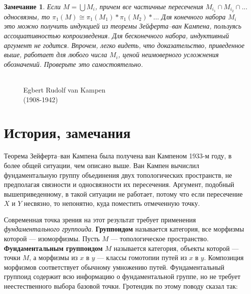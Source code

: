 \documentclass[12pt]{book}
\theoremstyle{upshape}
\newtheorem{zadacha}{Задача}[chapter]
\theoremstyle{generic}
\newtheorem{remark}[teorema]{Замечание}
\def\замечание{\begin{remark}}
\def\еза{\end{remark}}
\theoremstyle{upshapenonumber}
\newcommand{\следствие}{%
     \refstepcounter{teorema}
     {\noindent\bf Следствие \thechapter.\arabic{teorema}:\ }}
\newcommand{\пример}{%
     \refstepcounter{teorema}
     {\noindent\bf Пример \thechapter.\arabic{teorema}:\ }}
\newcommand{\лемма}{%
     \refstepcounter{teorema}
     {\noindent\bf Лемма \thechapter.\arabic{teorema}:\ }}
\newcommand{\теорема}{%
     \refstepcounter{teorema}
     {\noindent\bf Теорема \thechapter.\arabic{teorema}:\ }}
\newcommand{\утверждение}{%
     \refstepcounter{teorema}
     {\noindent\bf Утверждение \thechapter.\arabic{teorema}:\ }}
\def\хфилл{\hfill}
\def\бф{\bf}
\def\ем{\em}
\def\задача{\begin{zadacha}}
\def\ез{\end{zadacha}}
\def\еу{\end{ukazanie}}
\def\ео{\end{opredelenie}}
\def\енум{\begin{enumerate}}
\def\ее{\end{enumerate}}
\begin{document}
\замечание
Если $M= \bigcup M_i$, причем все частичные
пересечения $M_{i_1}\cap M_{i_2} \cap ...$
односвязны, то 
$\pi_1(M) \cong \pi_1(M_1) * \pi_1(M_2) *...$
Для конечного набора $M_i$ это можно получить
индукцией из теоремы Зейферта--ван Кампена,
пользуясь ассоциативностью копроизведения.
Для бесконечного набора, индуктивный аргумент не
годится. Впрочем, легко видеть, что доказательство,
приведенное выше, работает для любого числа
$M_i$, ценой неимоверного усложнения обозначений.
Проверьте это самостоятельно.
\еза



\begin{figure}[ht]
\begin{center}
\\
{ Egbert Rudolf van Kampen\\
(1908-1942)}
\end{center}
\end{figure}


\section{История, замечания}

Теорема Зейферта--ван Кампена была получена ван Кампеном 1933-м
году, в более общей ситуации, чем описано выше. Ван Кампен
вычислил фундаментальную группу объединения двух 
топологических пространств, не предполагая связности
и односвязности их пересечения. Аргумент, подобный
вышеприведенному, в такой ситуации не работает, 
потому что если пересечение $X$ и $Y$ несвязно,
то непонятно, куда поместить отмеченную
точку.

Современная точка зрения
на этот результат требует применения {\ем фундаментального
группоида}. {\бф Группоидом} называется категория,
все морфизмы которой --- изоморфизмы. Пусть $M$ --- топологическое
пространство. {\бф Фундаментальным группоидом} $M$
называется категория, объекты которой --- точки $M$,
а морфизмы из $x$ в $y$ --- классы гомотопии путей 
из $x$ в $y$. Композиция морфизмов соответствует
обычному умножению путей. Фундаментальный группоид
содержит всю информацию о фундаментальной группе,
но не требует неестественного выбора базовой точки.
Гротендик по этому поводу сказал так:

\хфилл
\end{document}
